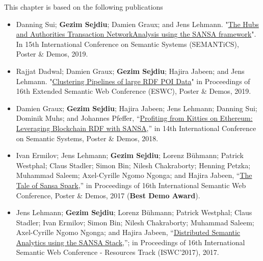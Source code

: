 This chapter is based on the following publications~\cite{lehmann-2017-sansa-iswc}
\begin{itemize}


   \item Danning Sui; \textbf{Gezim Sejdiu}; Damien Graux; and Jens Lehmann. "\href{https://gezimsejdiu.github.io/publications/sansa-hubs-and-authorities-transaction-semantics19-poster.pdf}{The Hubs and Authorities Transaction NetworkAnalysis using the SANSA framework}".  In 15th International Conference on Semantic Systems (SEMANTiCS), Poster \& Demos, 2019.
   
    \item Rajjat Dadwal; Damien Graux; \textbf{Gezim Sejdiu}; Hajira Jabeen; and Jens Lehmann. "\href{https://gezimsejdiu.github.io/publications/piping-clustering-eswc19-poster.pdf}{Clustering Pipelines of large RDF POI Data}" in Proceedings of 16th Extended Semantic Web Conference (ESWC), Poster \& Demos, 2019.
   
   \item Damien Graux; \textbf{Gezim Sejdiu}; Hajira Jabeen; Jens Lehmann; Danning Sui; Dominik Muhs; and Johannes Pfeffer, “\href{http://jens-lehmann.org/files/2018/semantics_ethereum_pd.pdf}{Profiting from Kitties on Ethereum: Leveraging Blockchain RDF with SANSA},” in 14th International Conference on Semantic Systems, Poster \& Demos, 2018.
    
    \item Ivan Ermilov; Jens Lehmann; \textbf{Gezim Sejdiu}; Lorenz Bühmann; Patrick Westphal; Claus Stadler; Simon Bin; Nilesh Chakraborty; Henning Petzka; Muhammad Saleem; Axel-Cyrille Ngomo Ngonga; and Hajira Jabeen, “\href{http://jens-lehmann.org/files/2017/iswc_pd_sansa.pdf}{The Tale of Sansa Spark},” in Proceedings of 16th International Semantic Web Conference, Poster \& Demos, 2017 ({\color{darkred}\textbf{Best Demo Award}}).
  
    \item Jens Lehmann; \textbf{Gezim Sejdiu}; Lorenz Bühmann; Patrick Westphal; Claus Stadler; Ivan Ermilov; Simon Bin; Nilesh Chakraborty; Muhammad Saleem; Axel-Cyrille Ngomo Ngonga; and Hajira Jabeen, “\href{http://svn.aksw.org/papers/2017/ISWC_SANSA_SoftwareFramework/public.pdf}{Distributed Semantic Analytics using the SANSA Stack},”; in Proceedings of 16th International Semantic Web Conference - Resources Track (ISWC’2017), 2017.


\end{itemize}

